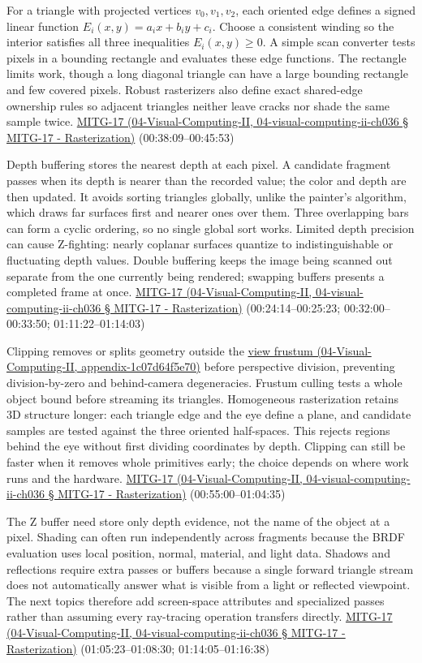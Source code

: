 For a triangle with projected vertices \(v_0,v_1,v_2\), each oriented edge defines a signed linear function \(E_i(x,y)=a_i x+b_i y+c_i\). Choose a consistent winding so the interior satisfies all three inequalities \(E_i(x,y)\ge 0\). A simple scan converter tests pixels in a bounding rectangle and evaluates these edge functions. The rectangle limits work, though a long diagonal triangle can have a large bounding rectangle and few covered pixels. Robust rasterizers also define exact shared-edge ownership rules so adjacent triangles neither leave cracks nor shade the same sample twice. \href{}{MITG-17 (04-Visual-Computing-II, 04-visual-computing-ii-ch036 § MITG-17 - Rasterization)} (00:38:09--00:45:53)

Depth buffering stores the nearest depth at each pixel. A candidate fragment passes when its depth is nearer than the recorded value; the color and depth are then updated. It avoids sorting triangles globally, unlike the painter's algorithm, which draws far surfaces first and nearer ones over them. Three overlapping bars can form a cyclic ordering, so no single global sort works. Limited depth precision can cause Z-fighting: nearly coplanar surfaces quantize to indistinguishable or fluctuating depth values. Double buffering keeps the image being scanned out separate from the one currently being rendered; swapping buffers presents a completed frame at once. \href{}{MITG-17 (04-Visual-Computing-II, 04-visual-computing-ii-ch036 § MITG-17 - Rasterization)} (00:24:14--00:25:23; 00:32:00--00:33:50; 01:11:22--01:14:03)

Clipping removes or splits geometry outside the \href{}{view frustum (04-Visual-Computing-II, appendix-1c07d64f5e70)} before perspective division, preventing division-by-zero and behind-camera degeneracies. Frustum culling tests a whole object bound before streaming its triangles. Homogeneous rasterization retains 3D structure longer: each triangle edge and the eye define a plane, and candidate samples are tested against the three oriented half-spaces. This rejects regions behind the eye without first dividing coordinates by depth. Clipping can still be faster when it removes whole primitives early; the choice depends on where work runs and the hardware. \href{}{MITG-17 (04-Visual-Computing-II, 04-visual-computing-ii-ch036 § MITG-17 - Rasterization)} (00:55:00--01:04:35)

The Z buffer need store only depth evidence, not the name of the object at a pixel. Shading can often run independently across fragments because the BRDF evaluation uses local position, normal, material, and light data. Shadows and reflections require extra passes or buffers because a single forward triangle stream does not automatically answer what is visible from a light or reflected viewpoint. The next topics therefore add screen-space attributes and specialized passes rather than assuming every ray-tracing operation transfers directly. \href{}{MITG-17 (04-Visual-Computing-II, 04-visual-computing-ii-ch036 § MITG-17 - Rasterization)} (01:05:23--01:08:30; 01:14:05--01:16:38)

